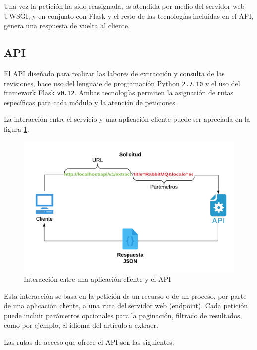 Una vez la petición ha sido reasignada, es atendida por medio del servidor web UWSGI, y en conjunto
con Flask y el resto de las tecnologías incluidas en el API, genera una respuesta de vuelta al cliente.

\subsection{API}

El API diseñado para realizar las labores de extracción y consulta de las revisiones, hace uso del lenguaje de programación Python \texttt{2.7.10} y el uso del framework Flask \texttt{v0.12}.
Ambas tecnologías permiten la asignación de rutas específicas para cada módulo
y la atención de peticiones.

La interacción entre el servicio y una aplicación cliente puede ser apreciada en la figura \ref{fig:diagram_api_1}.

\begin{figure}[H]
	\centering
		\includegraphics[width=1\textwidth]{figures/diagram_api_1}
	\caption{Interacción entre una aplicación cliente y el API}
	\label{fig:diagram_api_1}
\end{figure}

Esta interacción se basa en la petición de un recurso o de un proceso, por parte de una aplicación cliente, a una ruta del servidor web (endpoint).
Cada petición puede incluir parámetros opcionales para la paginación, filtrado de resultados, como por ejemplo, el idioma del artículo a extraer.

Las rutas de acceso que ofrece el API son las siguientes:


